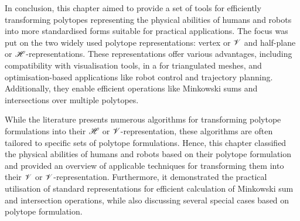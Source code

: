 




In conclusion, this chapter aimed to provide a set of tools for efficiently transforming polytopes representing the physical abilities of humans and robots into more standardised forms suitable for practical applications. The focus was put on the two widely used polytope representations: vertex or $\mathscr{V}$ and half-plane or $\mathscr{H}$-representations. These representations offer various advantages, including compatibility with visualisation tools, in a for triangulated meshes, and optimisation-based applications like robot control and trajectory planning. Additionally, they enable efficient operations like Minkowski sums and intersections over multiple polytopes.

While the literature presents numerous algorithms for transforming polytope formulations into their $\mathscr{H}$ or $\mathscr{V}$-representation, these algorithms are often tailored to specific sets of polytope formulations. Hence, this chapter classified the physical abilities of humans and robots based on their polytope formulation and provided an overview of applicable techniques for transforming them into their $\mathscr{V}$ or $\mathscr{V}$-representation. Furthermore, it demonstrated the practical utilisation of standard representations for efficient calculation of Minkowski sum and intersection operations, while also discussing several special cases based on polytope formulation.

